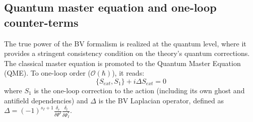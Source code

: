 \documentclass[twocolumn]{aastex631}
\begin{document}
\subsection{Quantum master equation and one-loop counter-terms}
The true power of the BV formalism is realized at the quantum level, where it provides a stringent consistency condition on the theory's quantum corrections. The classical master equation is promoted to the Quantum Master Equation (QME). To one-loop order ($\mathcal{O}(\hbar)$), it reads:
\begin{equation}
\{S_{ext}, S_1\} + i \Delta S_{ext} = 0
\end{equation}
where $S_1$ is the one-loop correction to the action (including its own ghost and antifield dependencies) and $\Delta$ is the BV Laplacian operator, defined as $\Delta = (-1)^{s_I+1} \frac{\delta_r}{\delta \Psi^I} \frac{\delta_l}{\delta \Psi^*_I}$.
\end{document}
